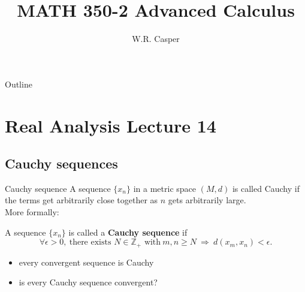 \documentclass{beamer}
\title{MATH 350-2 Advanced Calculus}
\subtitle
{} %
\author[W.R. Casper] %
{W.R. Casper}
\institute[California State University Fullerton] %
{
  Department of Mathematics\\
  California State University Fullerton}
\begin{document}
\begin{frame}
  \titlepage
\end{frame}

\begin{frame}{Outline}
  \tableofcontents
\end{frame}



\section{Real Analysis Lecture 14}

\subsection{Cauchy sequences}

\begin{frame}{Cauchy sequence}
A sequence $\{x_n\}$ in a metric space $(M,d)$ is called Cauchy if the terms get arbitrarily close together as $n$ gets arbitrarily large.\\
\pause
More formally:
\pause
\begin{defn}
A sequence $\{x_n\}$ is called a \textbf{Cauchy sequence} if
$$\forall \epsilon > 0,\ \text{there exists $N\in\mathbb Z_{+}$ with}\ m,n\geq N\ \Rightarrow\ d(x_m,x_n) < \epsilon.$$
\end{defn}
\begin{itemize}
\pause
\item every convergent sequence is Cauchy
\pause
\item is every Cauchy sequence convergent?
\end{itemize}
\end{frame}
\end{document}
